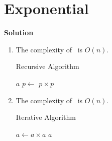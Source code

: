 \documentclass{../../cls/sig-alternate-05-2015}
\begin{document}
\section{Exponential}
\textbf{Solution}\begin{enumerate}[label=(\alph*)]
    \item The complexity of~ is $O(n)$.
    \begin{algorithm}[H]
        \caption{Recursive Algorithm}
        \label{a:6-a}
        \begin{algorithmic}
            \State \Return $a$
            \Else
            \State $p \leftarrow$ 
            \State \Return $p \times p$
            \EndIf
            \EndProcedure
        \end{algorithmic}
    \end{algorithm}

    \item The complexity of~ is $O(n)$.
    \begin{algorithm}[H]
        \caption{Iterative Algorithm}
        \label{a:6-b}
        \begin{algorithmic}
            \State $a \leftarrow a \times a$
            \EndFor
            \State \Return $a$
            \EndProcedure
        \end{algorithmic}
    \end{algorithm}
\end{enumerate}
\end{document}
